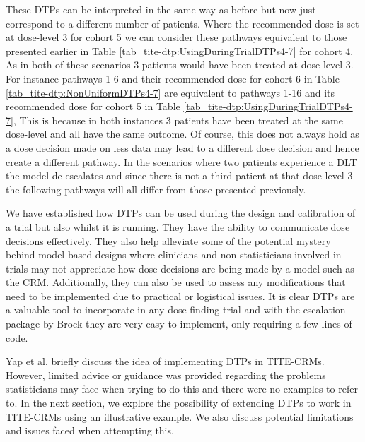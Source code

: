 These DTPs can be interpreted in the same way as before but now just correspond to a different number of patients. Where the recommended dose is set at dose-level 3 for cohort 5 we can consider these pathways equivalent to those presented earlier in Table \ref{tab_tite-dtp:UsingDuringTrialDTPs4-7} for cohort 4. As in both of these scenarios 3 patients would have been treated at dose-level 3. For instance pathways 1-6 and their recommended dose for cohort 6 in Table \ref{tab_tite-dtp:NonUniformDTPs4-7} are equivalent to pathways 1-16 and its recommended dose for cohort 5 in Table \ref{tab_tite-dtp:UsingDuringTrialDTPs4-7}, This is because in both instances 3 patients have been treated at the same dose-level and all have the same outcome. Of course, this does not always hold as a dose decision made on less data may lead to a different dose decision and hence create a different pathway. In the scenarios where two patients experience a DLT the model de-escalates and since there is not a third patient at that dose-level 3 the following pathways will all differ from those presented previously. 

We have established how DTPs can be used during the design and calibration of a trial but also whilst it is running. They have the ability to communicate dose decisions effectively. They also help alleviate some of the potential mystery behind model-based designs where clinicians and non-statisticians involved in trials may not appreciate how dose decisions are being made by a model such as the CRM. Additionally, they can also be used to assess any modifications that need to be implemented due to practical or logistical issues. It is clear DTPs are a valuable tool to incorporate in any dose-finding trial and with the escalation package by Brock \cite{brockModularApproachDose2020} they are very easy to implement, only requiring a few lines of code. 

Yap et al. \cite{yapDoseTransitionPathways2017} briefly discuss the idea of implementing DTPs in TITE-CRMs. However, limited advice or guidance was provided regarding the problems statisticians may face when trying to do this and there were no examples to refer to. In the next section, we explore the possibility of extending DTPs to work in TITE-CRMs using an illustrative example. We also discuss potential limitations and issues faced when attempting this.   


